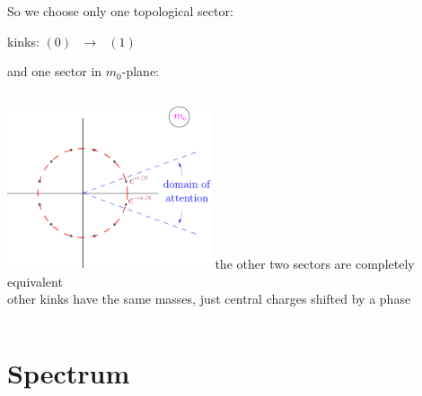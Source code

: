 \documentclass{beamer}
\begin{document}
\begin{frame}{}

	So we choose only one topological sector:\\[3mm]

\begin{block}
\qquad\qquad\qquad\qquad
	kinks: \qquad\qquad $ (0) ~~~\longrightarrow~~~ (1) $
\vspace{2mm}
\end{block}

\vspace{2mm}
	and one sector in $ m_0 $-plane:
\vspace{2mm}

\begin{block}{}
\begin{columns}[c]
\column{6cm}
\centering
	\vspace{-2mm}
	\includegraphics[width=6cm]{domain.pdf}
\column{5cm}
	the other two sectors are completely equivalent\\[4mm]
	other kinks have the same masses, 
	just central charges shifted by a phase
\end{columns}
\vspace{2mm}
\end{block}

\end{frame}


\section{Spectrum}
\end{document}
